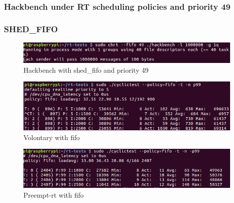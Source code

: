 \documentclass[10pt,a4paper]{article}
\begin{document}
\subsubsection{Hackbench under RT scheduling policies and priority 49}
\subsubsection{SHED\_FIFO}
\begin{figure}[H]
\includegraphics[width=16cm]{Hackbench2.png}
\caption{Hackbench with shed\_fifo and priority 49}
\end{figure}
\begin{figure}[H]
\includegraphics[width=16cm]{Preempt-Fifo-WithHackbench2.png}
\caption{Volontary with fifo}
\end{figure}
\begin{figure}[H]
\includegraphics[width=16cm]{Volontary-Fifo-WithHackbench2.png}
\caption{Preempt-rt with fifo}
\end{figure}
\end{document}

